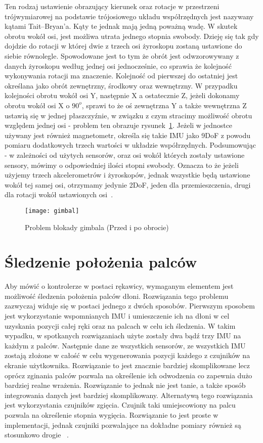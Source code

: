 Ten rodzaj ustawienie obrazujący kierunek oraz rotacje w przestrzeni trójwymiarowej na podstawie trójosiowego układu współrzędnych jest nazywany kątami Tait–Bryan'a. Kąty te jednak mają jedną poważną wadę. W skutek obrotu wokół osi, jest możliwa utrata jednego stopnia swobody. Dzieję się tak gdy dojdzie do rotacji w której dwie z trzech osi żyroskopu zostaną ustawione do siebie równolegle. Spowodowane jest to tym że obrót jest odwzorowywany z danych żyroskopu według jednej osi jednocześnie, co sprawia że kolejność wykonywania rotacji ma znaczenie. Kolejność od pierwszej do ostatniej jest określana jako obrót zewnętrzny, środkowy oraz wewnętrzny. W przypadku kolejności obrotu wokół osi Y, następnie X a ostatecznie Z, jeżeli dokonamy obrotu wokół osi X o $90^o$, sprawi to że oś zewnętrzna Y a także wewnętrzna Z ustawią się w jednej płaszczyźnie, w związku z czym stracimy możliwość obrotu względem jednej osi - problem ten obrazuje rysunek~\ref{fig:gimbal}. Jeżeli w jednostce używany jest również magnetometr, określa się takie IMU jako 9DoF z powodu pomiaru dodatkowych trzech wartości w układzie współrzędnych. Podsumowując - w zależności od użytych sensorów, oraz osi wokół których zostały ustawione sensory, mówimy o odpowiedniej ilości stopni swobody. Oznacza to że jeżeli użyjemy trzech akcelerometrów i żyroskopów, jednak wszystkie będą ustawione wokół tej samej osi, otrzymamy jedynie 2DoF, jeden dla przemieszczenia, drugi dla rotacji wokół ustawionych osi~\cite{rotations, botland-arduino}.	
\begin{figure}[h]
\centering
\texttt{[image: gimbal]}
\caption{Problem blokady gimbala (Przed i po obrocie)~\cite{sam2}}
\label{fig:gimbal}
\end{figure}	
		
\section{Śledzenie położenia palców}
\label{sec:palce}
 Aby mówić o kontrolerze w postaci rękawicy, wymaganym elementem jest możliwość śledzenia położenia palców dłoni. Rozwiązania tego problemu zazwyczaj widuje się w postaci jednego z dwóch sposobów. Pierwszym sposobem jest wykorzystanie wspomnianych IMU i umieszczenie ich na dłoni w cel uzyskania pozycji całej ręki oraz na palcach w celu ich śledzenia. W takim wypadku, w spotkanych rozwiązaniach użyte zostały dwa bądź trzy IMU na każdym z palców. Następnie dane ze wszystkich sensorów, ze wszystkich IMU zostają złożone w całość w celu wygenerowania pozycji każdego z czujników na ekranie użytkownika. Rozwiązanie to jest znacznie bardziej skomplikowane lecz oprócz zginania palców pozwala na określenie ich odwodzenia co zapewnia dużo bardziej realne wrażenia. Rozwiązanie to jednak nie jest tanie, a także sposób integrowania danych jest bardziej skomplikowany. Alternatywą tego rozwiązania jest wykorzystania czujników zgięcia. Czujnik taki umiejscowiony na palcu pozwala na określenie stopnia wygięcia. Rozwiązanie to jest proste w implementacji, jednak czujniki pozwalające na dokładne pomiary również są stosunkowo drogie ~\cite{manus, flex-sensor}.
			
